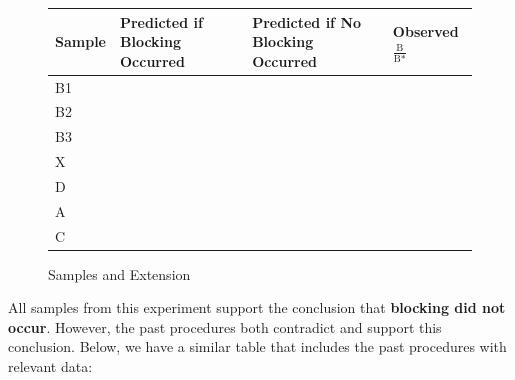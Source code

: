 \documentclass{ssiBio}
\begin{document}
\begin{figure}[ht]
\centering
\label{tab:sampleExtension}
\begin{tabular}{llll}
	Sample              & Predicted if Blocking Occurred & Predicted if No Blocking Occurred & Observed $\frac{\textrm{B}}{\textrm{B*}}$\\\hline
\multirow{2}{*}{B1} & \multirow{2}{*}{\B}             & \multirow{2}{*}{\N}                & \N         \\
                    &                                 &                                    & \N        \\\hline
\multirow{2}{*}{B2} & \multirow{2}{*}{\B}             & \multirow{2}{*}{\Y}                & \Y         \\
                    &                                 &                                    & \Y         \\\hline
\multirow{2}{*}{B3} & \multirow{2}{*}{\Y}             & \multirow{2}{*}{\Y}                & \Y         \\
                    &                                 &                                    & \Y         \\\hline
X                   & \N                              & \N                                 & \N         \\\hline
D                   & \B                              & \B                                 & \B         \\\hline
A                   & \Y                              & \Y                                 & \Y         \\\hline
C                   & \Y                              & \Y                                 & \Y        
\end{tabular}
	\caption{Samples and Extension}
\end{figure}
All samples from this experiment support the conclusion that \textbf{blocking did not occur}. However, the past procedures both contradict and support this conclusion. Below, we have a similar table that includes the past procedures with relevant data:
\end{document}
